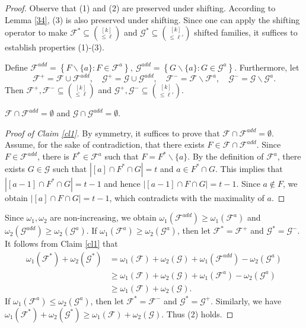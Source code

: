 \documentclass[10pt,a4paper]{amsart}
\begin{document}
\begin{proof}
Observe that (1) and (2) are preserved under shifting. According to Lemma \ref{34}, 
(3) is also preserved under shifting.
 Since one can apply the shifting operator to make $\mathcal{F}^*\subseteq\binom{[k]}{\leq \ell}$ and $\mathcal{G}^* \subseteq\binom{[k]}{\leq \ell'}$ shifted families, it suffices to establish properties (1)-(3).

Define
    $
    \mathcal{F}^{add}=\left\{F\backslash\{a\} : F\in \mathcal{F}^a   \right\},\ \mathcal{G}^{add}=\left\{G\backslash\{a\} : G\in \mathcal{G}^a   \right\}.
    $
Furthermore, let 
$$\mathcal{F}^+=\mathcal{F}\cup\mathcal{F}^{add},\quad \mathcal{G}^+=\mathcal{G}\cup\mathcal{G}^{add},\quad \mathcal{F}^-=\mathcal{F}\backslash\mathcal{F}^{a},\quad \mathcal{G}^-=\mathcal{G}\backslash\mathcal{G}^{a}.$$
Then  $\mathcal{F}^+, \mathcal{F}^-\subseteq \binom{[k]}{\leq \ell}$ and 
$\mathcal{G}^+, \mathcal{G}^-\subseteq \binom{[k]}{\leq \ell'}$.
\begin{claim}\label{cl1}
$\mathcal{F}\cap\mathcal{F}^{add}=\emptyset$ and $\mathcal{G}\cap\mathcal{G}^{add}=\emptyset$.
    \end{claim}
    \begin{proof}[Proof of Claim \ref{cl1}]
By symmetry, it suffices to prove that $\mathcal{F}\cap\mathcal{F}^{add}=\emptyset$.
        Assume, for the sake of contradiction, that  there exists $F\in\mathcal{F}\cap\mathcal{F}^{add}$.
     Since $F\in\mathcal{F}^{add}$, there is $F^*\in\mathcal{F}^a$
such that $F=F^*\backslash \{a\}$. By the definition of 
$\mathcal{F}^a$, there exists  $G\in \mathcal{G}$
 such that 
        $|[a]\cap F^*\cap G|=t$
        and $a\in F^*\cap G$.
This implies that $|[a-1]\cap F^*\cap G|=t-1$ and hence
        $
        |[a-1]\cap F\cap G|=t-1.
        $
Since $a\notin F$,  we obtain $|[a]\cap F\cap G|=t-1$, which contradicts with the maximality of $a$.
    \end{proof}

Since $ \omega_1, \omega_2$ are non-increasing, we obtain $\omega_1(\mathcal{F}^{add})\geq \omega_1(\mathcal{F}^a)$ and $\omega_2(\mathcal{G}^{add})\geq \omega_2(\mathcal{G}^a)$.
If $\omega_1(\mathcal{F}^a)\geq \omega_2(\mathcal{G}^a)$, then let
 $\mathcal{F}^*= \mathcal{F}^+$ and $\mathcal{G}^*=\mathcal{G}^-$.
It follows from Claim \ref{cl1} that
 \begin{align*}
       \omega_1(\mathcal{F}^*)+\omega_2(\mathcal{G}^*)&= \omega_1(\mathcal{F})+\omega_2(\mathcal{G})+\omega_1(\mathcal{F}^{add})-\omega_2(\mathcal{G}^a)\\
       &\geq\omega_1(\mathcal{F})+\omega_2(\mathcal{G})+\omega_1(\mathcal{F}^{a})-\omega_2(\mathcal{G}^a)\\
&\geq \omega_1(\mathcal{F})+\omega_2(\mathcal{G}).
        \end{align*}
If $\omega_1(\mathcal{F}^a)\leq \omega_2(\mathcal{G}^a)$, then let
 $\mathcal{F}^*= \mathcal{F}^-$ and $\mathcal{G}^*=\mathcal{G}^+$.
Similarly, we have $\omega_1(\mathcal{F}^*)+\omega_2(\mathcal{G}^*)\geq \omega_1(\mathcal{F})+\omega_2(\mathcal{G})$. Thus (2) holds.


\end{proof}
\end{document}
